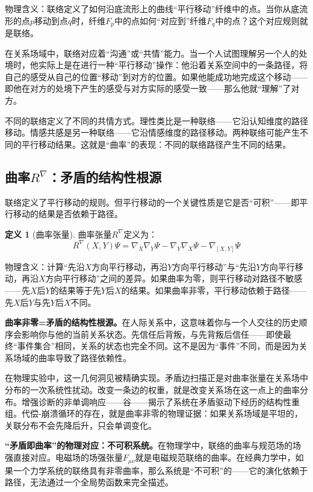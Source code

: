 \documentclass[11pt,a4paper]{book}
\theoremstyle{definition}
\newtheorem{definition}{定义}[chapter]
\begin{document}
物理含义：联络定义了如何沿底流形上的曲线“平行移动”纤维中的点。当你从底流形的点$p$移动到点$q$时，纤维$F_p$中的点如何“对应到”纤维$F_q$中的点？这个对应规则就是联络。

在关系场域中，联络对应着“沟通”或“共情”能力。当一个人试图理解另一个人的处境时，他实际上是在进行一种“平行移动”操作：他沿着关系空间中的一条路径，将自己的感受从自己的位置“移动”到对方的位置。如果他能成功地完成这个移动——即他在对方的处境下产生的感受与对方实际的感受一致——那么他就“理解”了对方。

不同的联络定义了不同的共情方式。理性类比是一种联络——它沿认知维度的路径移动。情感共感是另一种联络——它沿情感维度的路径移动。两种联络可能产生不同的平行移动结果。这就是“曲率”的表现：不同的联络路径产生不同的结果。

\subsection{曲率$R^\nabla$：矛盾的结构性根源}

联络定义了平行移动的规则。但平行移动的一个关键性质是它是否“可积”——即平行移动的结果是否依赖于路径。

\begin{definition}[曲率张量]
曲率张量$R^\nabla$定义为：
\begin{equation}
R^\nabla(X, Y)\Psi = \nabla_X \nabla_Y \Psi - \nabla_Y \nabla_X \Psi - \nabla_{[X, Y]}\Psi
\end{equation}
\end{definition}

物理含义：计算“先沿$X$方向平行移动，再沿$Y$方向平行移动”与“先沿$Y$方向平行移动，再沿$X$方向平行移动”之间的差异。如果曲率为零，则平行移动对路径不敏感——先$X$后$Y$的结果等于先$Y$后$X$的结果。如果曲率非零，平行移动依赖于路径——先$X$后$Y$与先$Y$后$X$不同。

\textbf{曲率非零=矛盾的结构性根源。}在人际关系中，这意味着你与一个人交往的历史顺序会影响你与他的当前关系状态。先信任后背叛，与先背叛后信任——即使最终“事件集合”相同，关系的状态也完全不同。这不是因为“事件”不同，而是因为关系场域的曲率导致了路径依赖性。

在物理实验中，这一几何洞见被精确实现。矛盾边扫描正是对曲率张量在关系场中分布的一次系统性扰动。改变一条边的权重，就是改变关系场在这一点上的曲率分布。增强诊断的非单调响应——谷——揭示了系统在矛盾驱动下经历的结构性重组。代偿-崩溃循环的存在，就是曲率非零的物理证据：如果关系场域是平坦的，关联分布不会先降后升，只会单调变化。

\textbf{“矛盾即曲率”的物理对应：不可积系统。}在物理学中，联络的曲率与规范场的场强直接对应。电磁场的场强张量$F_{\mu\nu}$就是电磁规范联络的曲率。在经典力学中，如果一个力学系统的联络具有非零曲率，那么系统是“不可积”的——它的演化依赖于路径，无法通过一个全局势函数来完全描述。
\end{document}
